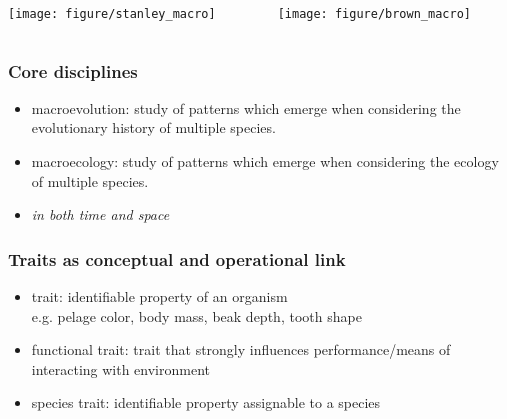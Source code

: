 \documentclass{beamer}
\begin{document}
\begin{frame}
  \begin{columns}
    \begin{column}{0.5\textwidth}
      \begin{center}
        \texttt{[image: figure/stanley\_macro]}
      \end{center}
    \end{column}
    \begin{column}{0.5\textwidth}
      \begin{center}
        \texttt{[image: figure/brown\_macro]}
      \end{center}
    \end{column}
  \end{columns}
\end{frame}

\begin{frame}
  \frametitle{Core disciplines}
  \begin{definition}
    \begin{itemize}
      \item \alert{macroevolution}: study of patterns which emerge when considering the evolutionary history of multiple species.
      \item \alert{macroecology}: study of patterns which emerge when considering the ecology of multiple species.
      \item \emph{in both time and space}
    \end{itemize}
  \end{definition}
\end{frame}

\begin{frame}
  \frametitle{Traits as conceptual and operational link}

  \begin{definition}
    \begin{itemize}
      \item \alert{trait}: identifiable property of an organism \\e.g. pelage color, body mass, beak depth, tooth shape
      \item \alert{functional trait}: trait that strongly influences performance/means of interacting with environment
      \item \alert{species trait}: identifiable property assignable to a species
    \end{itemize}
  \end{definition}
\end{frame}
\end{document}
